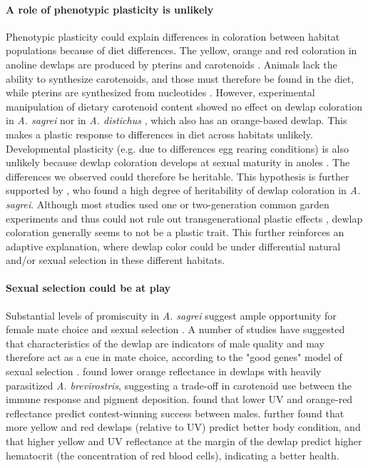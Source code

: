 \paragraph{A role of phenotypic plasticity is unlikely} Phenotypic plasticity could explain differences in coloration between habitat populations because of diet differences. The yellow, orange and red coloration in anoline dewlaps are produced by pterins and carotenoids \citep{Ortiz1962, Ortiz1962a, Ortiz1963, Ortiz1966, Macedonia2000, Steffen2007, Steffen2009}. Animals lack the ability to synthesize carotenoids, and those must therefore be found in the diet, while pterins are synthesized from nucleotides \citep{Goodwin1984, Hill2002, Hill2006}. However, experimental manipulation of dietary carotenoid content showed no effect on dewlap coloration in \textit{A. sagrei} \citep{Steffen2010} nor in \textit{A. distichus} \citep{Ng2013}, which also has an orange-based dewlap. This makes a plastic response to differences in diet across habitats unlikely. Developmental plasticity (e.g. due to differences egg rearing conditions) is also unlikely because dewlap coloration develops at sexual maturity in anoles \citep{Ng2013}. The differences we observed could therefore be heritable. This hypothesis is further supported by \citet{Cox2017}, who found a high degree of heritability of dewlap coloration in \textit{A. sagrei}. Although most studies used one or two-generation common garden experiments and thus could not rule out transgenerational plastic effects \citep{Tariel2020}, dewlap coloration generally seems to not be a plastic trait. This further reinforces an adaptive explanation, where dewlap color could be under differential natural and/or sexual selection in these different habitats.


\paragraph{Sexual selection could be at play} Substantial levels of promiscuity in \textit{A. sagrei} suggest ample opportunity for female mate choice and sexual selection \citep{Kamath2018}. A number of studies have suggested that characteristics of the dewlap are indicators of male quality and may therefore act as a cue in mate choice, according to the "good genes" model of sexual selection \citep{Andersson1994}. \citet{Cook2013} found lower orange reflectance in dewlaps with heavily parasitized \textit{A. brevirostris}, suggesting a trade-off in carotenoid use between the immune response and pigment deposition. \citet{Steffen2014} found that lower UV and orange-red reflectance predict contest-winning success between males. \citet{Driessens2015} further found that more yellow and red dewlaps (relative to UV) predict better body condition, and that higher yellow and UV reflectance at the margin of the dewlap predict higher hematocrit (the concentration of red blood cells), indicating a better health.\\ 

